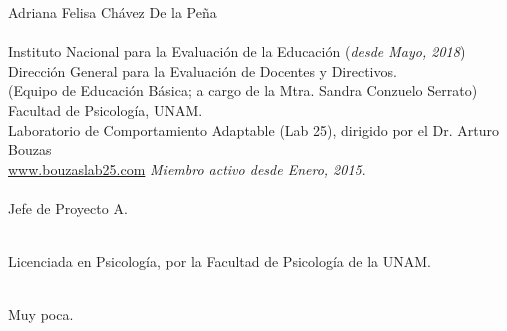 \documentclass[11pt]{article}
\begin{document}

\maketitle %

\thispagestyle{empty} %

\newpage


\begin{question}

  Adriana Felisa Chávez De la Peña\\

\\  
Instituto Nacional para la Evaluación de la Educación (\textit{desde Mayo, 2018})\\
Dirección General para la Evaluación de Docentes y Directivos.\\
(Equipo de Educación Básica; a cargo de la Mtra. Sandra Conzuelo Serrato)\\

Facultad de Psicología, UNAM.\\
Laboratorio de Comportamiento Adaptable (Lab 25), dirigido por el Dr. Arturo Bouzas\\
\href{http://www.bouzaslab25.com/}{www.bouzaslab25.com}
\textit{Miembro activo desde Enero, 2015}.\\


\\
Jefe de Proyecto A.

\\
Licenciada en Psicología, por la Facultad de Psicología de la UNAM.

\\
Muy poca.\\


\end{question}
\end{document}
